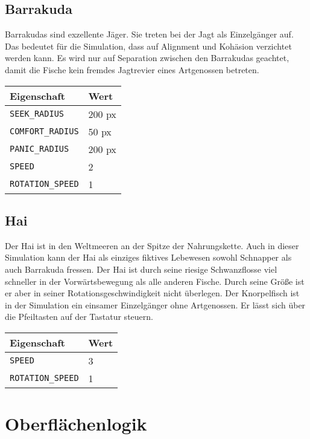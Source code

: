 \documentclass[11pt]{article}
\begin{document}
\subsection{Barrakuda}
Barrakudas sind exzellente Jäger. Sie treten bei der Jagt als Einzelgänger auf. Das bedeutet für die Simulation, dass auf Alignment und Kohäsion verzichtet werden kann. Es wird nur auf Separation zwischen den Barrakudas geachtet, damit die Fische kein fremdes Jagtrevier eines Artgenossen betreten.\\

\begin{tabular}{|l|l|}
\hline
	\textbf{Eigenschaft} & \textbf{Wert}\\
\hline
\hline
	\lstinline[]$SEEK_RADIUS$  & 200 px\\
\hline
	\lstinline[]$COMFORT_RADIUS$ & 50 px\\
\hline
	\lstinline[]$PANIC_RADIUS$ & 200 px\\
\hline
	\lstinline[]$SPEED$ & 2\\
\hline
	\lstinline[]$ROTATION_SPEED$ & 1\\
\hline
\end{tabular}

\subsection{Hai}
Der Hai ist in den Weltmeeren an der Spitze der Nahrungskette. Auch in dieser Simulation kann der Hai als einziges fiktives Lebewesen sowohl Schnapper als auch Barrakuda fressen. Der Hai ist durch seine riesige Schwanzflosse viel schneller in der Vorwärtsbewegung als alle anderen Fische. Durch seine Größe ist er aber in seiner Rotationsgeschwindigkeit nicht überlegen. Der Knorpelfisch ist in der Simulation ein einsamer Einzelgänger ohne Artgenossen. Er lässt sich über die Pfeiltasten auf der Tastatur steuern.\\

\begin{tabular}{|l|l|}
\hline
	\textbf{Eigenschaft} & \textbf{Wert}\\
\hline
\hline
	\lstinline[]$SPEED$ & 3\\
\hline
	\lstinline[]$ROTATION_SPEED$ & 1\\
\hline
\end{tabular}

\section{Oberflächenlogik}
\end{document}
